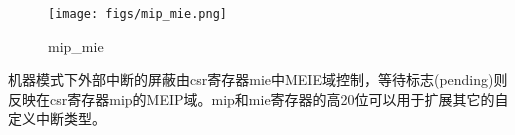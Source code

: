 \begin{figure}[H] %
    \centering %
    \texttt{[image: figs/mip\_mie.png]} %
    \caption{mip_mie} %
    \label{Fig.9} %
\end{figure}

机器模式下外部中断的屏蔽由csr寄存器mie中MEIE域控制，等待标志(pending)则反映在csr寄存器mip的MEIP域。mip和mie寄存器的高20位可以用于扩展其它的自定义中断类型。








